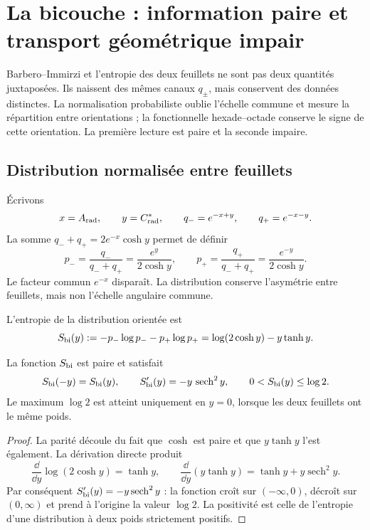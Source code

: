 \chapter{La bicouche : information paire et transport géométrique impair}
\label{chap:paridad-bicapa-barbero-rev6}

Barbero--Immirzi et l'entropie des deux feuillets ne sont pas deux quantités
juxtaposées. Ils naissent des mêmes canaux \(q_\pm\), mais conservent des données
distinctes. La normalisation probabiliste oublie l'échelle commune et mesure la
répartition entre orientations ; la fonctionnelle hexade--octade conserve le
signe de cette orientation. La première lecture est paire et la seconde impaire.

\section{Distribution normalisée entre feuillets}

Écrivons
\[
 x=A_{\rm rad},
 \qquad
 y=C^*_{\rm rad},
 \qquad
 q_-=e^{-x+y},
 \qquad
 q_+=e^{-x-y}.
\]
La somme \(q_-+q_+=2e^{-x}\cosh y\) permet de définir
\[
 p_-=\frac{q_-}{q_-+q_+}
     =\frac{e^y}{2\cosh y},
 \qquad
 p_+=\frac{q_+}{q_-+q_+}
     =\frac{e^{-y}}{2\cosh y}.
\]
Le facteur commun \(e^{-x}\) disparaît. La distribution conserve l'asymétrie
entre feuillets, mais non l'échelle angulaire commune.

\begin{definition}
\label{def:entropia-bicapa-rev6}
L'entropie de la distribution orientée est
\[
 S_{\rm bi}(y)
 :=
 -p_-\log p_--p_+\log p_+
 =
 \log(2\cosh y)-y\tanh y.
\]
\end{definition}

\begin{proposition}
\label{prop:paridad-entropia-bicapa-rev6}
La fonction \(S_{\rm bi}\) est paire et satisfait
\[
 S_{\rm bi}(-y)=S_{\rm bi}(y),
 \qquad
 S_{\rm bi}'(y)=-y\,\operatorname{sech}^2y,
 \qquad
 0<S_{\rm bi}(y)\leq\log2.
\]
Le maximum \(\log2\) est atteint uniquement en \(y=0\), lorsque les deux feuillets
ont le même poids.
\end{proposition}

\begin{proof}
La parité découle du fait que \(\cosh\) est paire et que \(y\tanh y\) l'est également.
La dérivation directe produit
\[
 \frac{\dd}{\dd y}\log(2\cosh y)=\tanh y,
 \qquad
 \frac{\dd}{\dd y}(y\tanh y)
 =\tanh y+y\operatorname{sech}^2y.
\]
Par conséquent \(S_{\rm bi}'(y)=-y\operatorname{sech}^2y\) : la fonction croît sur
\((-\infty,0)\), décroît sur \((0,\infty)\) et prend à l'origine la valeur
\(\log2\). La positivité est celle de l'entropie d'une distribution à deux
poids strictement positifs.
\end{proof}

